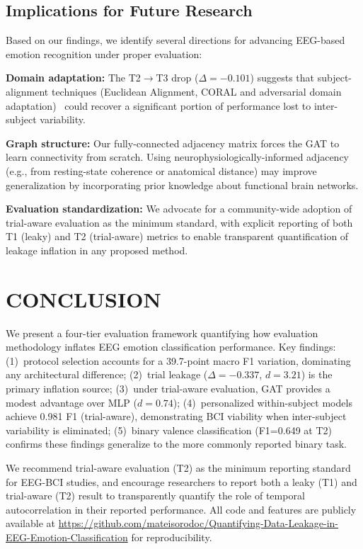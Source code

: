 \documentclass[a4paper, 10pt, conference]{ieeeconf}
\begin{document}
\subsection{Implications for Future Research}

Based on our findings, we identify several directions for advancing EEG-based emotion recognition under proper evaluation:

\textbf{Domain adaptation:} The T2$\to$T3 drop ($\Delta=-0.101$) suggests that subject-alignment techniques (Euclidean Alignment, CORAL and adversarial domain adaptation)~\cite{lotte2018} could recover a significant portion of performance lost to inter-subject variability.

\textbf{Graph structure:} Our fully-connected adjacency matrix forces the GAT to learn connectivity from scratch. Using neurophysiologically-informed adjacency (e.g., from resting-state coherence or anatomical distance) may improve generalization by incorporating prior knowledge about functional brain networks.

\textbf{Evaluation standardization:} We advocate for a community-wide adoption of trial-aware evaluation as the minimum standard, with explicit reporting of both T1 (leaky) and T2 (trial-aware) metrics to enable transparent quantification of leakage inflation in any proposed method.

\section{CONCLUSION}

We present a four-tier evaluation framework quantifying how evaluation methodology inflates EEG emotion classification performance. Key findings: (1)~protocol selection accounts for a 39.7-point macro F1 variation, dominating any architectural difference; (2)~trial leakage ($\Delta=-0.337$, $d=3.21$) is the primary inflation source; (3)~under trial-aware evaluation, GAT provides a modest advantage over MLP ($d=0.74$); (4)~personalized within-subject models achieve 0.981 F1 (trial-aware), demonstrating BCI viability when inter-subject variability is eliminated; (5)~binary valence classification (F1=0.649 at T2) confirms these findings generalize to the more commonly reported binary task.

We recommend trial-aware evaluation (T2) as the minimum reporting standard for EEG-BCI studies, and encourage researchers to report both a leaky (T1) and trial-aware (T2) result to transparently quantify the role of temporal autocorrelation in their reported performance. All code and features are publicly available at \url{https://github.com/mateisorodoc/Quantifying-Data-Leakage-in-EEG-Emotion-Classification} for reproducibility.
\end{document}
